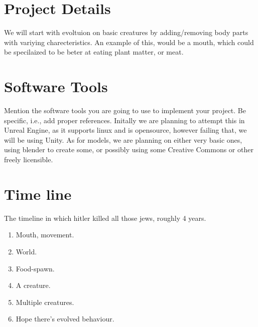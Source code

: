 \documentclass[runningheads]{llncs}
\begin{document}
\section{Project Details}
We will start with evoltuion on basic creatures by adding/removing body parts with variying charecteristics. An example of this, would be a mouth, which could be specilaized to be beter at eating plant matter, or meat.

\section{Software Tools}
Mention the software tools you are going to use to implement your project. Be specific, i.e., add proper references.
Initally we are planning to attempt this in Unreal Engine, as it supports linux and is opensource, however failing that, we will be using Unity.
As for models, we are planning on either very basic ones, using blender to create some, or possibly using some Creative Commons or other freely licensible.

\section{Time line}
The timeline in which hitler killed all those jews, roughly 4 years.
\begin{enumerate}
\item Mouth, movement.
\item World.
\item Food-spawn.
\item A creature.
\item Multiple creatures.
\item Hope there's evolved behaviour.
\end{enumerate}





\end{document}
